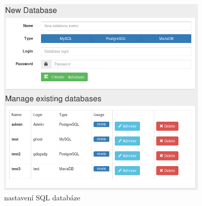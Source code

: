 \documentclass[11pt,a4paper]{article}
\begin{document}
      \begin{figure}[ht]
        \begin{center}
          \includegraphics[width=10cm]{sql}
          \caption{nastavení SQL databáze}
        \end{center}
      \end{figure}
\end{document}
